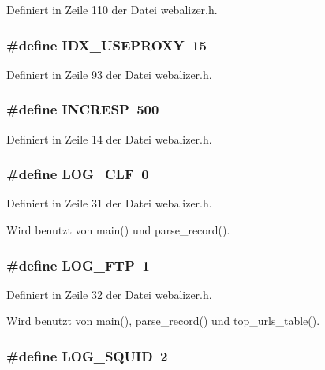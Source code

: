 Definiert in Zeile 110 der Datei webalizer.h.
\subsubsection{\setlength{\rightskip}{0pt plus 5cm}\#define IDX\_\-USEPROXY~15}\label{webalizer_8h_78d0d675c3de5dae71aa53d872331bc4}




Definiert in Zeile 93 der Datei webalizer.h.
\subsubsection{\setlength{\rightskip}{0pt plus 5cm}\#define INCRESP~500}\label{webalizer_8h_08a8f937430dfb2f8d178491808565c4}




Definiert in Zeile 14 der Datei webalizer.h.
\subsubsection{\setlength{\rightskip}{0pt plus 5cm}\#define LOG\_\-CLF~0}\label{webalizer_8h_5ce0d49d0e92ba00b7385ef68d26b51a}




Definiert in Zeile 31 der Datei webalizer.h.

Wird benutzt von main() und parse\_\-record().
\subsubsection{\setlength{\rightskip}{0pt plus 5cm}\#define LOG\_\-FTP~1}\label{webalizer_8h_cf5d4c2811adb735aaf5b32f62cc3cea}




Definiert in Zeile 32 der Datei webalizer.h.

Wird benutzt von main(), parse\_\-record() und top\_\-urls\_\-table().
\subsubsection{\setlength{\rightskip}{0pt plus 5cm}\#define LOG\_\-SQUID~2}\label{webalizer_8h_43821087b540ecbc400b7cef8ab10be0}




